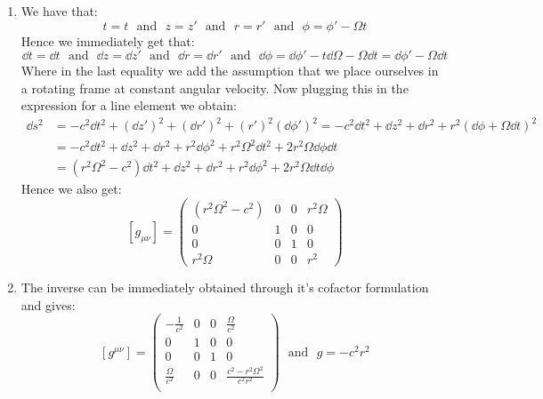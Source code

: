 \documentclass[10pt,a4paper]{article}
\begin{document}
\begin{enumerate}

\item We have that:
\[
t = t \mbox{~~and~~} z = z' \mbox{~~and~~} r = r' \mbox{~~and~~} \phi = \phi' - \Omega t
\]
Hence we immediately get that:
\[
\dd t = \dd t \mbox{~~and~~} \dd z = \dd z' \mbox{~~and~~} \dd r = \dd r' \mbox{~~and~~} \dd \phi = \dd \phi' - t \dd \Omega  - \Omega \dd t = \dd \phi' - \Omega \dd t
\]
Where in the last equality we add the assumption that we place ourselves in a rotating frame at constant angular velocity. Now plugging this in the expression for a line element we obtain:
\begin{align*}
\dd s^2 &= -c^2 \dd t^2 + (\dd z')^2 + (\dd r')^2 + (r')^2 (\dd \phi')^2 = - c^2 \dd t^2 + \dd z^2 + \dd r^2 + r^2 (\dd \phi + \Omega \dd t)^2\\
&= - c^2 \dd t^2 + \dd z^2 + \dd r^2 + r^2 \dd \phi^2 + r^2 \Omega^2 \dd t^2 + 2 r^2 \Omega \dd \phi \dd t\\
&= (r^2 \Omega^2 - c^2) \dd t^2 + \dd z^2 + \dd r^2 + r^2 \dd \phi^2 + 2r^2 \Omega \dd t \dd \phi
\end{align*}
Hence we also get:
\[
[g_{\mu \nu}] = \begin{pmatrix}
(r^2 \Omega^2 - c^2) & 0 & 0 & r^2 \Omega\\
0 & 1 & 0 & 0\\
0 & 0 & 1 & 0\\
r^2 \Omega & 0 & 0 & r^2
\end{pmatrix}
\]

\item The inverse can be immediately obtained through it's cofactor formulation and gives:
\[
[g^{\mu\nu}] = \left(
\begin{array}{cccc}
 -\frac{1}{c^2} & 0 & 0 & \frac{\Omega }{c^2} \\
 0 & 1 & 0 & 0 \\
 0 & 0 & 1 & 0 \\
 \frac{\Omega }{c^2} & 0 & 0 & \frac{c^2 - r^2 \Omega ^2}{c^2 r^2} \\
\end{array}
\right) \mbox{~~and~~} g = -c^2 r^2 
\]


\end{enumerate}
\end{document}
